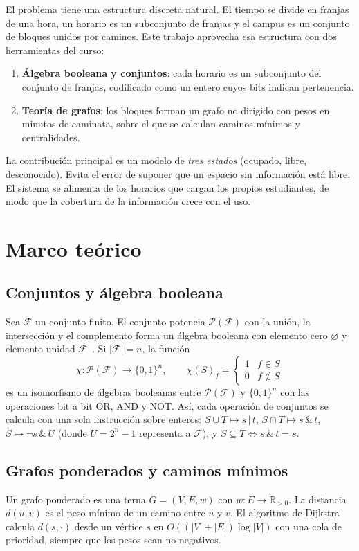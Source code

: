 \documentclass[conference,a4paper]{IEEEtran}
\newcommand{\F}{\mathcal{F}}
\begin{document}
El problema tiene una estructura discreta natural. El tiempo se divide en franjas de
una hora, un horario es un subconjunto de franjas y el campus es un conjunto de
bloques unidos por caminos. Este trabajo aprovecha esa estructura con dos
herramientas del curso:
\begin{enumerate}
  \item \textbf{Álgebra booleana y conjuntos}: cada horario es un subconjunto del
  conjunto de franjas, codificado como un entero cuyos bits indican pertenencia.
  \item \textbf{Teoría de grafos}: los bloques forman un grafo no dirigido con pesos en
  minutos de caminata, sobre el que se calculan caminos mínimos y centralidades.
\end{enumerate}

La contribución principal es un modelo de \emph{tres estados} (ocupado, libre,
desconocido). Evita el error de suponer que un espacio sin información está libre.
El sistema se alimenta de los horarios que cargan los propios estudiantes, de modo que
la cobertura de la información crece con el uso.

\section{Marco teórico}

\subsection{Conjuntos y álgebra booleana}
Sea $\F$ un conjunto finito. El conjunto potencia $\mathcal{P}(\F)$ con la unión, la
intersección y el complemento forma un álgebra booleana con elemento cero
$\varnothing$ y elemento unidad $\F$~\cite{rosen}. Si $|\F|=n$, la función
\[
  \chi:\mathcal{P}(\F)\to\{0,1\}^n,\qquad \chi(S)_f = \begin{cases}1 & f\in S\\ 0 & f\notin S\end{cases}
\]
es un isomorfismo de álgebras booleanas entre $\mathcal{P}(\F)$ y $\{0,1\}^n$ con las
operaciones bit a bit OR, AND y NOT. Así, cada operación de conjuntos se calcula con
una sola instrucción sobre enteros: $S\cup T\mapsto s\,|\,t$, $S\cap T\mapsto s\,\&\,t$,
$\overline{S}\mapsto \lnot s\,\&\,U$ (donde $U=2^n-1$ representa a $\F$), y
$S\subseteq T \iff s\,\&\,t = s$.

\subsection{Grafos ponderados y caminos mínimos}
Un grafo ponderado es una terna $G=(V,E,w)$ con $w:E\to\mathbb{R}_{>0}$. La distancia
$d(u,v)$ es el peso mínimo de un camino entre $u$ y $v$. El algoritmo de
Dijkstra~\cite{dijkstra} calcula $d(s,\cdot)$ desde un vértice $s$ en
$O((|V|+|E|)\log|V|)$ con una cola de prioridad, siempre que los pesos sean no
negativos.
\end{document}
